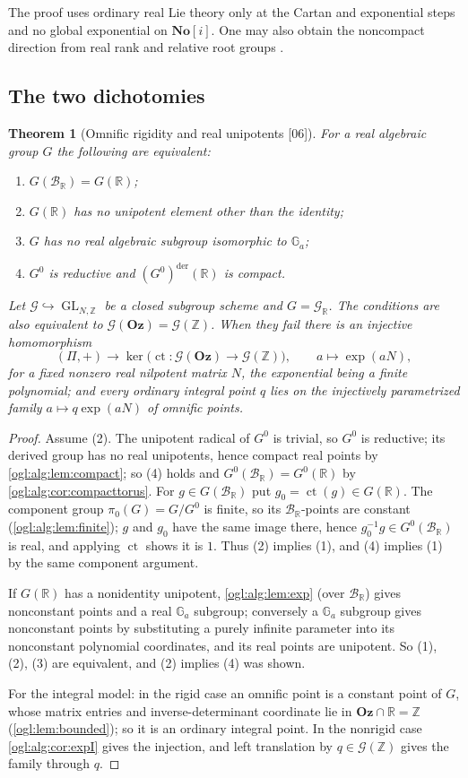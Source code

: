 \documentclass[11pt,oneside]{article}
\numberwithin{equation}{section}
\newtheorem{theorem}{Theorem}[section]
\theoremstyle{definition}
\theoremstyle{remark}
\newcommand{\No}{\mathbf{No}}
\newcommand{\Oz}{\mathbf{Oz}}
\newcommand{\SC}{\No[i]}
\newcommand{\Z}{\mathbb Z}
\newcommand{\R}{\mathbb R}
\newcommand{\BR}{\mathcal B_{\R}}
\newcommand{\cG}{\mathcal G}
\newcommand{\Ga}{\mathbb G_a}
\newcommand{\ct}{\operatorname{ct}}
\newcommand{\GL}{\operatorname{GL}}
\newcommand{\der}{\mathrm{der}}
\newcommand{\src}[1]{\textup{\textsf{\small[#1]}}}
\begin{document}
The proof uses ordinary real Lie theory only at the Cartan and exponential
steps and no global exponential on $\SC$. One may also obtain the noncompact
direction from real rank and relative root groups \cite[Sections~22--23]{MilneRG}.

\subsection{The two dichotomies}

\begin{theorem}[Omnific rigidity and real unipotents \src{06}]\label{ogl:alg:thm:real}
For a real algebraic group $G$ the following are equivalent:
\begin{enumerate}
\item $G(\BR)=G(\R)$;
\item $G(\R)$ has no unipotent element other than the identity;
\item $G$ has no real algebraic subgroup isomorphic to $\Ga$;
\item $G^0$ is reductive and $(G^0)^{\der}(\R)$ is compact.
\end{enumerate}
Let $\cG\hookrightarrow\GL_{N,\Z}$ be a closed subgroup scheme and $G=\cG_\R$.
The conditions are also equivalent to $\cG(\Oz)=\cG(\Z)$. When they fail there
is an injective homomorphism
\[
 (\Pi,+)\longrightarrow\ker\bigl(\ct:\cG(\Oz)\to\cG(\Z)\bigr),\qquad
 a\longmapsto\exp(aN),
\]
for a fixed nonzero real nilpotent matrix $N$, the exponential being a finite
polynomial; and every ordinary integral point $q$ lies on the injectively
parametrized family $a\mapsto q\exp(aN)$ of omnific points.
\end{theorem}
\begin{proof}
Assume (2). The unipotent radical of $G^0$ is trivial, so $G^0$ is reductive;
its derived group has no real unipotents, hence compact real points by
\cref{ogl:alg:lem:compact}; so (4) holds and $G^0(\BR)=G^0(\R)$ by
\cref{ogl:alg:cor:compacttorus}. For $g\in G(\BR)$ put $g_0=\ct(g)\in G(\R)$.
The component group $\pi_0(G)=G/G^0$ is finite, so its $\BR$-points are
constant (\cref{ogl:alg:lem:finite}); $g$ and $g_0$ have the same image there,
hence $g_0^{-1}g\in G^0(\BR)$ is real, and applying $\ct$ shows it is $1$.
Thus (2) implies (1), and (4) implies (1) by the same component argument.

If $G(\R)$ has a nonidentity unipotent, \cref{ogl:alg:lem:exp} (over $\BR$)
gives nonconstant points and a real $\Ga$ subgroup; conversely a $\Ga$
subgroup gives nonconstant points by substituting a purely infinite parameter
into its nonconstant polynomial coordinates, and its real points are
unipotent. So (1), (2), (3) are equivalent, and (2) implies (4) was shown.

For the integral model: in the rigid case an omnific point is a constant
point of $G$, whose matrix entries and inverse-determinant coordinate lie in
$\Oz\cap\R=\Z$ (\cref{ogl:lem:bounded}); so it is an ordinary integral point.
In the nonrigid case \cref{ogl:alg:cor:expI} gives the injection, and left
translation by $q\in\cG(\Z)$ gives the family through $q$.
\end{proof}
\end{document}
